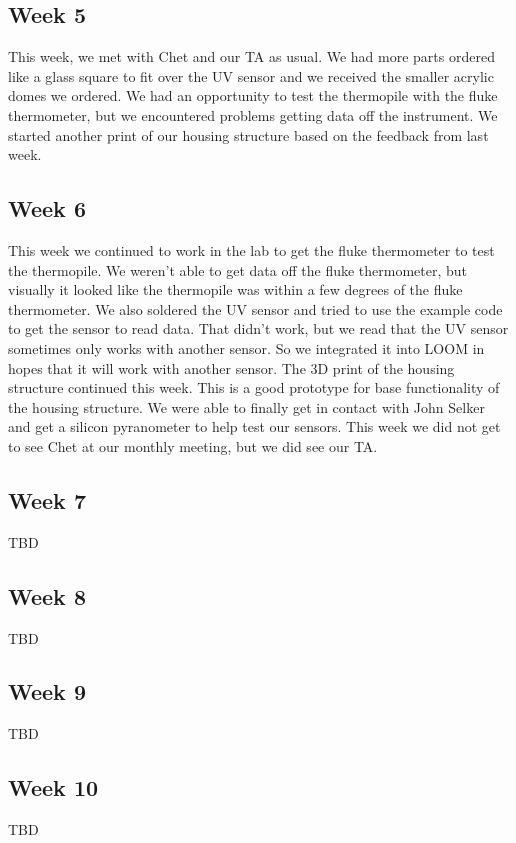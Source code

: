 \documentclass[10pt,draftclsnofoot,onecolumn,letterpaper]{article}
\begin{document}
\subsection{Week 5}
This week, we met with Chet and our TA as usual. We had more parts ordered like a glass square to fit over the UV sensor and we received the smaller acrylic domes we ordered. We had an opportunity to test the thermopile with the fluke thermometer, but we encountered problems getting data off the instrument. We started another print of our housing structure based on the feedback from last week. 

\subsection{Week 6}
This week we continued to work in the lab to get the fluke thermometer to test the thermopile. We weren't able to get data off the fluke thermometer, but visually it looked like the thermopile was within a few degrees of the fluke thermometer. We also soldered the UV sensor and tried to use the example code to get the sensor to read data. That didn't work, but we read that the UV sensor sometimes only works with another sensor. So we integrated it into LOOM in hopes that it will work with another sensor. The 3D print of the housing structure continued this week. This is a good prototype for base functionality of the housing structure. We were able to finally get in contact with John Selker and get a silicon pyranometer to help test our sensors. This week we did not get to see Chet at our monthly meeting, but we did see our TA. 

\subsection{Week 7}
TBD

\subsection{Week 8}
TBD
 
\subsection{Week 9}
TBD

\subsection{Week 10}
TBD
\end{document}
